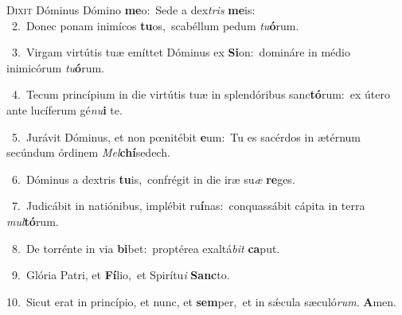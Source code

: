 \lettrine{\initial\textcolor{\initialcolor}{D}}{ixit} Dóminus Dómino \textbf{me}\-o:~\star Sede a dex\textit{tris} \textbf{me}\-is:\\
{\numbfont\textcolor{\numbcolor}{~2.}}~Donec ponam inimícos \textbf{tu}\-os,~\star scabéllum pedum \textit{tu}\-\textbf{ó}rum.\par
{\numbfont\textcolor{\numbcolor}{~3.}}~Virgam virtútis tuæ emíttet Dóminus ex \textbf{Si}\-on:~\star domináre in médio inimicórum \textit{tu}\-\textbf{ó}rum.\par
{\numbfont\textcolor{\numbcolor}{~4.}}~Tecum princípium in die virtútis tuæ in splendóribus sanc\-\textbf{tó}\-rum:~\star ex útero ante lucíferum gé\-\textit{nu}\-\textbf{i} te.\par
{\numbfont\textcolor{\numbcolor}{~5.}}~Jurávit Dóminus, et non pœnitébit \textbf{e}\-um:~\star Tu es sacérdos in ætérnum secúndum órdinem \textit{Mel}\-\textbf{chí}sedech.\par
{\numbfont\textcolor{\numbcolor}{~6.}}~Dóminus a dextris \textbf{tu}\-is,~\star confrégit in die iræ su\textit{æ} \textbf{re}\-ges.\par
{\numbfont\textcolor{\numbcolor}{~7.}}~Judicábit in natiónibus, implébit ru\-\textbf{í}\-nas:~\star conquassábit cápita in terra \textit{mul}\-\textbf{tó}rum.\par
{\numbfont\textcolor{\numbcolor}{~8.}}~De torrénte in via \textbf{bi}\-bet:~\star proptérea exaltá\textit{bit} \textbf{ca}\-put.\par
{\numbfont\textcolor{\numbcolor}{~9.}}~Glória Patri, et \textbf{Fí}\-lio,~\star et Spirítu\textit{i} \textbf{Sanc}\-to.\par
{\numbfont\textcolor{\numbcolor}{10.}}~Sicut erat in princípio, et nunc, et \textbf{sem}\-per,~\star et in sǽcula sæculó\-\textit{rum}\-. \textbf{A}\-men.\par
